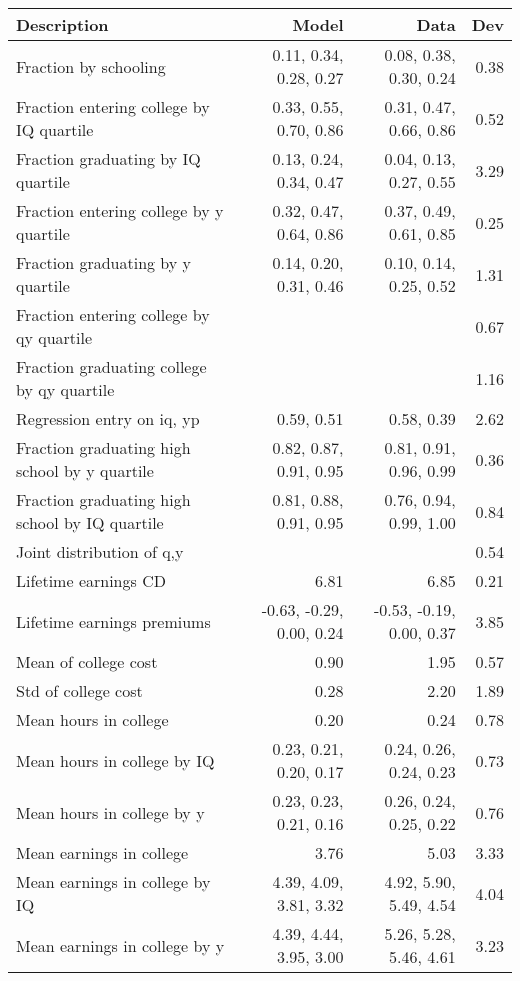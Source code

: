 \begin{tabular}{lrrr}
\hline
Description & Model  & Data  & Dev  \\ 
\hline
Fraction by schooling & 0.11, 0.34, 0.28, 0.27  & 0.08, 0.38, 0.30, 0.24  & 0.38  \\ 
Fraction entering college by IQ quartile & 0.33, 0.55, 0.70, 0.86  & 0.31, 0.47, 0.66, 0.86  & 0.52  \\ 
Fraction graduating by IQ quartile & 0.13, 0.24, 0.34, 0.47  & 0.04, 0.13, 0.27, 0.55  & 3.29  \\ 
Fraction entering college by y quartile & 0.32, 0.47, 0.64, 0.86  & 0.37, 0.49, 0.61, 0.85  & 0.25  \\ 
Fraction graduating by y quartile & 0.14, 0.20, 0.31, 0.46  & 0.10, 0.14, 0.25, 0.52  & 1.31  \\ 
Fraction entering college by qy quartile &   &   & 0.67  \\ 
Fraction graduating college by qy quartile &   &   & 1.16  \\ 
Regression entry on iq, yp & 0.59, 0.51  & 0.58, 0.39  & 2.62  \\ 
Fraction graduating high school by y quartile & 0.82, 0.87, 0.91, 0.95  & 0.81, 0.91, 0.96, 0.99  & 0.36  \\ 
Fraction graduating high school by IQ quartile & 0.81, 0.88, 0.91, 0.95  & 0.76, 0.94, 0.99, 1.00  & 0.84  \\ 
Joint distribution of q,y &   &   & 0.54  \\ 
Lifetime earnings CD & 6.81  & 6.85  & 0.21  \\ 
Lifetime earnings premiums & -0.63, -0.29, 0.00, 0.24  & -0.53, -0.19, 0.00, 0.37  & 3.85  \\ 
Mean of college cost & 0.90  & 1.95  & 0.57  \\ 
Std of college cost & 0.28  & 2.20  & 1.89  \\ 
Mean hours in college & 0.20  & 0.24  & 0.78  \\ 
Mean hours in college by IQ & 0.23, 0.21, 0.20, 0.17  & 0.24, 0.26, 0.24, 0.23  & 0.73  \\ 
Mean hours in college by y & 0.23, 0.23, 0.21, 0.16  & 0.26, 0.24, 0.25, 0.22  & 0.76  \\ 
Mean earnings in college & 3.76  & 5.03  & 3.33  \\ 
Mean earnings in college by IQ & 4.39, 4.09, 3.81, 3.32  & 4.92, 5.90, 5.49, 4.54  & 4.04  \\ 
Mean earnings in college by y & 4.39, 4.44, 3.95, 3.00  & 5.26, 5.28, 5.46, 4.61  & 3.23  \\ 

\end{tabular}
